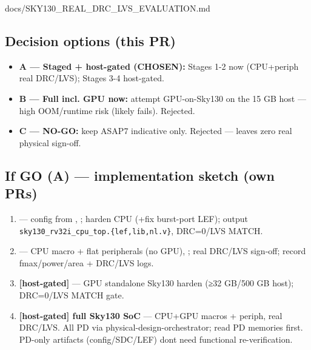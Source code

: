 \begin{relocated}{docs/SKY130_REAL_DRC_LVS_EVALUATION.md}
\subsection{Decision options (this PR)}\label{tm:pd:sky130-real-drc-lvs:4-decision-options-this-pr}

\begin{itemize}
\tightlist
\item
  \textbf{A --- Staged + host-gated (CHOSEN):} Stages 1-2 now
  (CPU+periph real DRC/LVS); Stages 3-4 host-gated.
\item
  \textbf{B --- Full incl. GPU now:} attempt GPU-on-Sky130 on the 15 GB
  host --- high OOM/\allowbreak{}runtime risk (likely fails). Rejected.
\item
  \textbf{C --- NO-GO:} keep ASAP7 indicative only. Rejected --- leaves
  zero real physical sign-off.
\end{itemize}

\subsection{If GO (A) --- implementation sketch (own PRs)}\label{tm:pd:sky130-real-drc-lvs:5-if-go-a-implementation-sketch-own-prs}

\begin{enumerate}
\def\labelenumi{\arabic{enumi}.}
\tightlist
\item
  \textbf{} --- config from ,
  ; harden CPU (+fix  burst-port
  LEF); output
  \texttt{sky130\_\allowbreak{}rv32i\_\allowbreak{}cpu\_\allowbreak{}top.\allowbreak{}\{lef,\allowbreak{}lib,\allowbreak{}nl.\allowbreak{}v\}},
  DRC=0/LVS MATCH.
\item
  \textbf{} --- CPU macro + flat peripherals (no
  GPU), ; real DRC/LVS sign-off; record
  fmax/\allowbreak{}power/\allowbreak{}area + DRC/LVS logs.
\item
  \textbf{{[}host-gated{]} } --- GPU standalone
  Sky130 harden (≥32 GB/500 GB host); DRC=0/LVS MATCH gate.
\item
  \textbf{{[}host-gated{]} full Sky130 SoC} --- CPU+GPU macros + periph,
  real DRC/LVS. All PD via physical-design-orchestrator; read PD
  memories first. PD-only artifacts
  (config/\allowbreak{}SDC/\allowbreak{}LEF) don\textquotesingle t need
  functional re-verification.
\end{enumerate}


\end{relocated}
